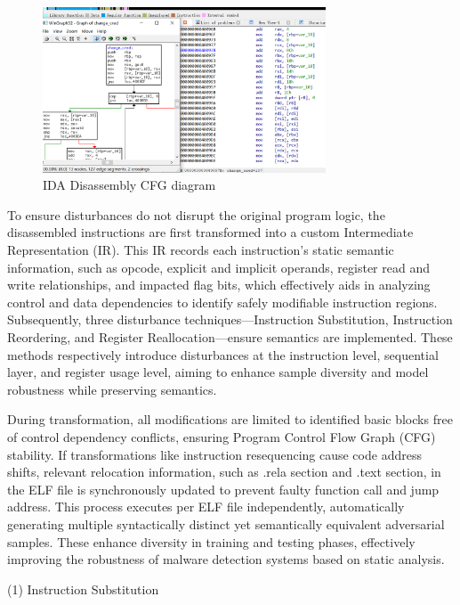 \begin{figure}[hbt]
	\centering
	\includegraphics[width=0.75\textwidth]{figures/4.1}
	\caption{IDA Disassembly CFG diagram}\label{fig:4.1}
\end{figure}


To ensure disturbances do not disrupt the original program logic, the disassembled instructions are first transformed into a custom Intermediate Representation (IR). This IR records each instruction's static semantic information, such as opcode, explicit and implicit operands, register read and write relationships, and impacted flag bits, which effectively aids in analyzing control and data dependencies to identify safely modifiable instruction regions. Subsequently, three disturbance techniques—Instruction Substitution, Instruction Reordering, and Register Reallocation—ensure semantics are implemented. These methods respectively introduce disturbances at the instruction level, sequential layer, and register usage level, aiming to enhance sample diversity and model robustness while preserving semantics.

During transformation, all modifications are limited to identified basic blocks free of control dependency conflicts, ensuring Program Control Flow Graph (CFG) stability. If transformations like instruction resequencing cause code address shifts, relevant relocation information, such as .rela section and .text section, in the ELF file is synchronously updated to prevent faulty function call and jump address. This process executes per ELF file independently, automatically generating multiple syntactically distinct yet semantically equivalent adversarial samples. These enhance diversity in training and testing phases, effectively improving the robustness of malware detection systems based on static analysis.

(1) Instruction Substitution

